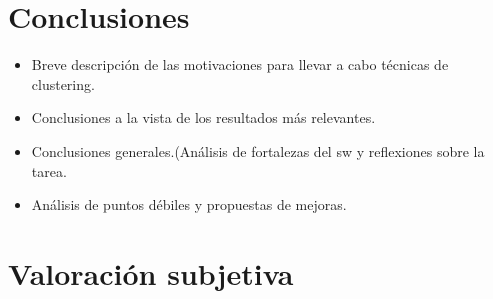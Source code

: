 \documentclass[10pt,a4paper]{article}
\begin{document}
%



\section{Conclusiones}

	\begin{itemize}
		\item Breve descripción de las motivaciones para llevar a cabo técnicas de clustering.
		\item Conclusiones a la vista de los resultados más relevantes.
		\item Conclusiones generales.(Análisis de fortalezas del sw y reflexiones sobre la tarea.
		\item Análisis de puntos débiles y propuestas de mejoras.
	\end{itemize}

\section{Valoración subjetiva}
\end{document}
